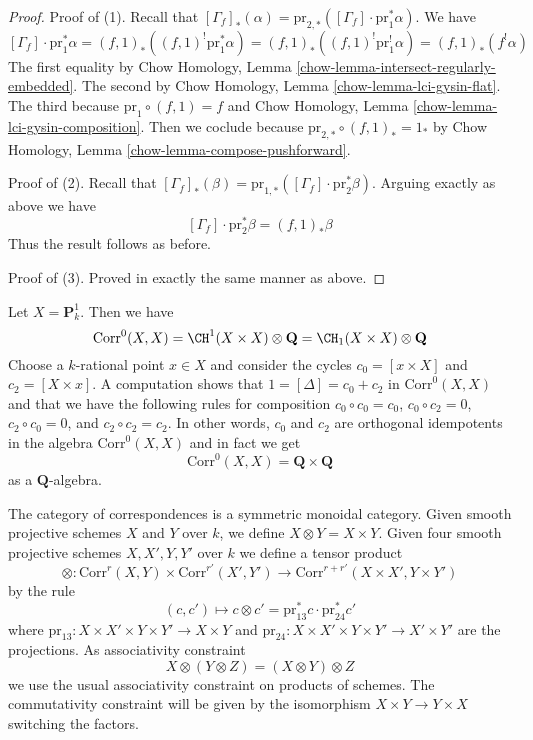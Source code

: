 \begin{proof}
Proof of (1). Recall that
$[\Gamma_f]_*(\alpha) =
\text{pr}_{2, *}([\Gamma_f] \cdot \text{pr}_1^*\alpha)$.
We have
$$
[\Gamma_f] \cdot \text{pr}_1^*\alpha =
(f, 1)_*((f, 1)^! \text{pr}_1^*\alpha) =
(f, 1)_*((f, 1)^! \text{pr}_1^!\alpha) =
(f, 1)_*(f^!\alpha)
$$
The first equality by Chow Homology, Lemma
\ref{chow-lemma-intersect-regularly-embedded}.
The second by 
Chow Homology, Lemma \ref{chow-lemma-lci-gysin-flat}.
The third because $\text{pr}_1 \circ (f, 1) = f$ and
Chow Homology, Lemma \ref{chow-lemma-lci-gysin-composition}.
Then we coclude because
$\text{pr}_{2, *} \circ (f, 1)_* = 1_*$ by
Chow Homology, Lemma \ref{chow-lemma-compose-pushforward}.

\medskip\noindent
Proof of (2). Recall that $[\Gamma_f]_*(\beta) =
\text{pr}_{1, *}([\Gamma_f] \cdot \text{pr}_2^*\beta)$.
Arguing exactly as above we have
$$
[\Gamma_f] \cdot \text{pr}_2^*\beta = (f, 1)_*\beta
$$
Thus the result follows as before.

\medskip\noindent
Proof of (3). Proved in exactly the same manner as above.
\end{proof}

\begin{example}
\label{example-decompose-P1}
Let $X = \mathbf{P}^1_k$. Then we have
$$
\text{Corr}^0(X, X) = \CH^1(X \times X) \otimes \mathbf{Q} =
\CH_1(X \times X) \otimes \mathbf{Q}
$$
Choose a $k$-rational point $x \in X$ and
consider the cycles $c_0 = [x \times X]$ and $c_2 = [X \times x]$.
A computation shows that $1 = [\Delta] = c_0 + c_2$ in $\text{Corr}^0(X, X)$
and that we have the following rules for composition
$c_0 \circ c_0 = c_0$,
$c_0 \circ c_2 = 0$,
$c_2 \circ c_0 = 0$, and
$c_2 \circ c_2 = c_2$.
In other words, $c_0$ and $c_2$ are orthogonal idempotents in
the algebra $\text{Corr}^0(X, X)$ and in fact we get
$$
\text{Corr}^0(X, X) = \mathbf{Q} \times \mathbf{Q}
$$
as a $\mathbf{Q}$-algebra.
\end{example}

\noindent
The category of correspondences is a symmetric monoidal category.
Given smooth projective schemes $X$ and $Y$ over $k$, we define
$X \otimes Y = X \times Y$. Given four smooth projective schemes
$X, X', Y, Y'$ over $k$ we define a tensor product
$$
\otimes :
\text{Corr}^r(X, Y) \times \text{Corr}^{r'}(X', Y')
\longrightarrow
\text{Corr}^{r + r'}(X \times X', Y \times Y')
$$
by the rule
$$
(c, c') \longmapsto
c \otimes c' = \text{pr}_{13}^*c \cdot \text{pr}_{24}^*c'
$$
where $\text{pr}_{13} : X \times X' \times Y \times Y' \to X \times Y$
and $\text{pr}_{24} : X \times X' \times Y \times Y' \to X' \times Y'$
are the projections. As associativity constraint
$$
X \otimes (Y \otimes Z) = (X \otimes Y) \otimes Z
$$
we use the usual associativity constraint on products of schemes.
The commutativity constraint will be given by the isomorphism
$X \times Y \to Y \times X$ switching the factors.

